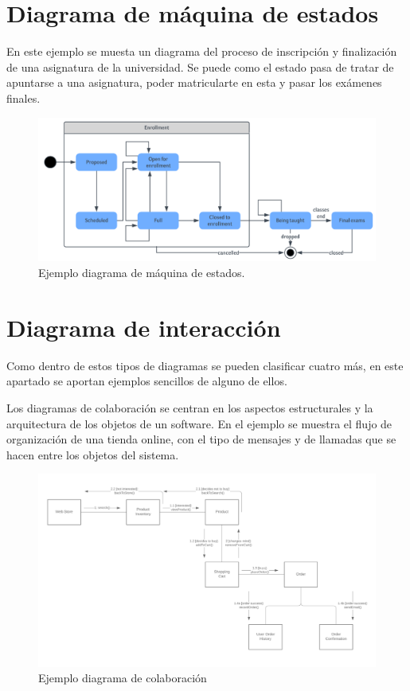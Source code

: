 \documentclass[a4paper, 12pt]{book}
\begin{document}
\section{Diagrama de máquina de estados}
En este ejemplo se muesta un diagrama del proceso de inscripción y finalización de una asignatura de la universidad. Se puede como el estado pasa de tratar de apuntarse a una asignatura, poder matricularte en esta y pasar los exámenes finales. 
\begin{figure}
	\centering
	\includegraphics[width=16cm, keepaspectratio]{img/diagrama_maquina_estados.png}
	\caption{Ejemplo diagrama de máquina de estados.}\label{fig:diagrama_maquina_estados}
\end{figure}

\section{Diagrama de interacción}
Como dentro de estos tipos de diagramas se pueden clasificar cuatro más, en este apartado se aportan ejemplos sencillos de alguno de ellos.

Los diagramas de colaboración se centran en los aspectos estructurales y la arquitectura de los objetos de un software. En el ejemplo se muestra el flujo de organización de una tienda online, con el tipo de mensajes y de llamadas que se hacen entre los objetos del sistema. 
\begin{figure}
	\centering
	\includegraphics[width=14cm, keepaspectratio]{img/diagrama_colaboracion.png}
	\caption{Ejemplo diagrama de colaboración}\label{fig:diagrama_colaboracion}
\end{figure}
\end{document}
